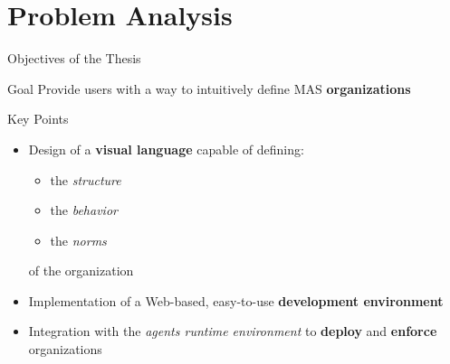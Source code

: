 \section{Problem Analysis}
\begin{frame}{Objectives of the Thesis}
    \begin{block}{Goal}
        Provide users with a way to intuitively define MAS \textbf{organizations}
    \end{block}
    
    \begin{exampleblock}{Key Points}
        \begin{itemize}
            \item Design of a \textbf{visual language} capable of defining:
            \begin{itemize}
                \item the \emph{structure}
                \item the \emph{behavior}
                \item the \emph{norms}
            \end{itemize}
            of the organization
            \item Implementation of a Web-based, easy-to-use \textbf{development environment}
            \item Integration with the \textit{agents runtime environment} to \textbf{deploy} and \textbf{enforce} organizations
        \end{itemize}
    \end{exampleblock}
\end{frame}


